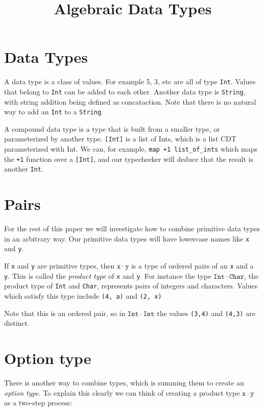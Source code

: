 \documentclass{article}
\title{Algebraic Data Types}
\date{}
\begin{document}
\maketitle

\section{Data Types}

A data type is a class of values. For example 5, 3, etc are all of type \verb!Int!. Values that belong to \verb!Int! can be added to each other. Another data type is \verb!String!, with string addition being defined as concataction. Note that there is no natural way to add an \verb!Int! to a \verb!String!.

A compound data type is a type that is built from a smaller type, or parameterized by another type. \verb![Int]! is a list of Ints, which is a list CDT parameterized with Int. We can, for example, \verb!map +1 list_of_ints! which maps the \verb!+1! function over a \verb![Int]!, and our typechecker will deduce that the result is another \verb!Int!.

\section{Pairs} 

For the rest of this paper we will investigate how to combine primitive data types in an arbitrary way. Our primitive data types will have lowercase names like \verb!x! and \verb!y!.

If \verb!x! and \verb!y! are primitive types, then $\mathtt{x \cdot y}$ is a type of ordered pairs of an \verb!x! and a \verb!y!. This is called the \emph{product type} of \verb!x! and \verb!y!. For instance the type $\mathtt{Int \cdot Char}$, the product type of \verb!Int! and \verb!Char!, represents pairs of integers and characters. Values which satisfy this type include \verb!(4, a)! and \verb!(2, x)!

Note that this is an ordered pair, so in $\mathtt{Int \cdot Int}$ the values \verb!(3,4)! and \verb!(4,3)! are distinct.

\section{Option type}

There is another way to combine types, which is summing them to create an \emph{option type}. To explain this clearly we can think of creating a product type $\mathtt{x \cdot y}$ as a two-step process:
\end{document}
